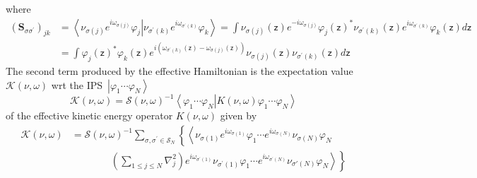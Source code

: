 \documentclass[aps,preprint]{revtex4}%
\begin{document}
where
\begin{align}
\left(  \mathbf{S}_{\sigma\sigma^{\prime}}\right)  _{jk}  &  =\left\langle
\left.  \nu_{\sigma\left(  j\right)  }e^{i\omega_{\sigma\left(  j\right)  }%
}\varphi_{j}\right\vert \nu_{\sigma^{\prime}\left(  k\right)  }e^{i\omega
_{\sigma^{\prime}\left(  k\right)  }}\varphi_{k}\right\rangle =%
{\displaystyle\int}
\nu_{\sigma\left(  j\right)  }\left(  \mathsf{z}\right)  e^{-i\omega
_{\sigma\left(  j\right)  }}\varphi_{j}\left(  \mathsf{z}\right)  ^{\ast}%
\nu_{\sigma^{\prime}\left(  k\right)  }\left(  \mathsf{z}\right)
e^{i\omega_{\sigma^{\prime}\left(  k\right)  }}\varphi_{k}\left(
\mathsf{z}\right)  d\mathsf{z}\nonumber\\
&  =%
{\displaystyle\int}
\varphi_{j}\left(  \mathsf{z}\right)  ^{\ast}\varphi_{k}\left(  \mathsf{z}%
\right)  e^{i\left(  \omega_{\sigma^{\prime}\left(  k\right)  }\left(
\mathsf{z}\right)  -\omega_{\sigma\left(  j\right)  }\left(  \mathsf{z}%
\right)  \right)  }\nu_{\sigma\left(  j\right)  }\left(  \mathsf{z}\right)
\nu_{\sigma^{\prime}\left(  k\right)  }\left(  \mathsf{z}\right)  d\mathsf{z}%
\end{align}
The second term produced by the effective Hamiltonian is the expectation value
$\mathcal{K}\left(  \nu,\omega\right)  $ wrt the IPS\ $\left\vert \varphi
_{1}\cdots\varphi_{N}\right\rangle $
\begin{equation}
\mathcal{K}\left(  \nu,\omega\right)  =\mathcal{S}\left(  \nu,\omega\right)
^{-1}\left\langle \varphi_{1}\cdots\varphi_{N}\right\vert \left.  K\left(
\nu,\omega\right)  \varphi_{1}\cdots\varphi_{N}\right\rangle
\end{equation}
of the effective kinetic energy operator $K\left(  \nu,\omega\right)  $ given
by
\begin{align}
\mathcal{K}\left(  \nu,\omega\right)   &  =\mathcal{S}\left(  \nu
,\omega\right)  ^{-1}%
{\displaystyle\sum\limits_{\sigma,\sigma^{\prime}\in\mathcal{S}_{N}}}
\left\{  \left\langle \nu_{\sigma\left(  1\right)  }e^{i\omega_{\sigma\left(
1\right)  }}\varphi_{1}\cdots e^{i\omega_{\sigma\left(  N\right)  }}%
\nu_{\sigma\left(  N\right)  }\varphi_{N}\right.  \right. \nonumber\\
&  \qquad\qquad\left.  \left(
{\displaystyle\sum\limits_{1\leq j\leq N}}
\nabla_{j}^{2}\right)  \left.  e^{i\omega_{\sigma^{\prime}\left(  1\right)  }%
}\nu_{\sigma^{\prime}\left(  1\right)  }\varphi_{1}\cdots e^{i\omega
_{\sigma^{\prime}\left(  N\right)  }}\nu_{\sigma\prime\left(  N\right)
}\varphi_{N}\right\rangle \right\}
\end{align}
\end{document}
